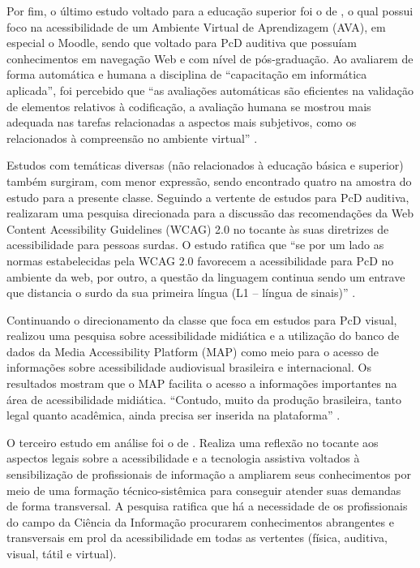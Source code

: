 \documentclass{textolivre}
\begin{document}
Por fim, o último estudo voltado para a educação superior foi o de \textcite{pivetta2014}, o qual possui foco na acessibilidade de um Ambiente Virtual de Aprendizagem (AVA), em especial o Moodle, sendo que voltado para PcD auditiva que possuíam conhecimentos em navegação Web e com nível de pós-graduação. Ao avaliarem de forma automática e humana a disciplina de “capacitação em informática aplicada”, foi percebido que “as avaliações automáticas são eficientes na validação de elementos relativos à codificação, a avaliação humana se mostrou mais adequada nas tarefas relacionadas a aspectos mais subjetivos, como os relacionados à compreensão no ambiente virtual” \cite[p. 159]{pivetta2014}.

Estudos com temáticas diversas (não relacionados à educação básica e superior) também surgiram, com menor expressão, sendo encontrado quatro \cite{alperstedtneto2018, flor2013, hott2019, spolidorio2017} na amostra do estudo para a presente classe. Seguindo a vertente de estudos para PcD auditiva, \textcite{flor2013} realizaram uma pesquisa direcionada para a discussão das recomendações da Web Content Acessibility Guidelines (WCAG) 2.0 no tocante às suas diretrizes de acessibilidade para pessoas surdas. O estudo ratifica que “se por um lado as normas estabelecidas pela WCAG 2.0 favorecem a acessibilidade para PcD no ambiente da web, por outro, a questão da linguagem continua sendo um entrave que distancia o surdo da sua primeira língua (L1 – língua de sinais)” \cite[p. 167]{flor2013}.

Continuando o direcionamento da classe que foca em estudos para PcD visual, \textcite{spolidorio2017} realizou uma pesquisa sobre acessibilidade midiática e a utilização do banco de dados da Media Accessibility Platform (MAP) como meio para o acesso de informações sobre acessibilidade audiovisual brasileira e internacional. Os resultados mostram que o MAP facilita o acesso a informações importantes na área de acessibilidade midiática. “Contudo, muito da produção brasileira, tanto legal quanto acadêmica, ainda precisa ser inserida na plataforma” \cite[p. 343]{spolidorio2017}.

O terceiro estudo em análise foi o de \textcite{hott2019}. Realiza uma reflexão no tocante aos aspectos legais sobre a acessibilidade e a tecnologia assistiva voltados à sensibilização de profissionais de informação a ampliarem seus conhecimentos por meio de uma formação técnico-sistêmica para conseguir atender suas demandas de forma transversal. A pesquisa ratifica que há a necessidade de os profissionais do campo da Ciência da Informação procurarem conhecimentos abrangentes e transversais em prol da acessibilidade em todas as vertentes (física, auditiva, visual, tátil e virtual).
\end{document}
